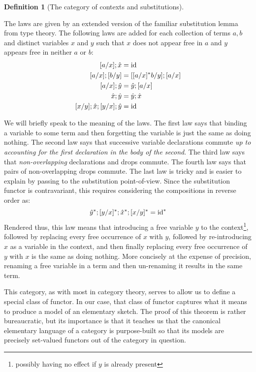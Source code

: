 \documentclass[12pt,twoside]{reedthesis}
\theoremstyle{definition}
\newtheorem{definition}{Definition}
\theoremstyle{remark}
\theoremstyle{plain}
\begin{document}
\begin{definition}[The category of contexts and substitutions]
\begin{outline}
    \1 The laws are given by an extended version of the familiar substitution
    lemma from type theory. The following laws are added for each collection of
    terms $a,b$ and distinct variables $x$ and $y$ such that $x$ does not appear
    free in $a$ and $y$ appears free in neither $a$ or $b$:
    \begin{align*}
      [a/x] ; \hat{x} &= \textrm{id} \\
      [a/x] ; [b/y]   &= [ [ a/x ]^{*} b/y ] ; [a/x] \\
      [a/x]; \hat{y} &= \hat{y}; [a/x] \\
      \hat{x}; \hat{y} &= \hat{y}; \hat{x} \\
      [x/y]; \hat{x}; [y/x]; \hat{y} &= \textrm{id}
    \end{align*}
  \end{outline}
  We will briefly speak to the meaning of the laws. The first law says that
  binding a variable to some term and then forgetting the variable is just the
  same as doing nothing. The second law says that successive variable
  declarations commute \emph{up to accounting for the first declaration in the
    body of the second}. The third law says that \emph{non-overlapping}
  declarations and drops commute. The fourth law says that pairs of
  non-overlapping drops commute. The last law is tricky and is easier to explain
  by passing to the substitution point-of-view. Since the substitution functor
  is contravariant, this requires considering the compositions in reverse order
  as:
  \[ \hat{y}^{*}; [y/x]^{*}; \hat{x}^{*}; [x/y]^{*} = {\textrm{id}}^{*} \] Rendered
  thus, this law means that introducing a free variable $y$ to the
  context\footnote{possibly having no effect if $y$ is already present},
  followed by replacing every free occurrence of $x$ with $y$, followed by
  re-introducing $x$ as a variable in the context, and then finally replacing
  every free occurrence of $y$ with $x$ is the same as doing nothing. More
  concisely at the expense of precision, renaming a free variable in a term and
  then un-renaming it results in the same term.
\end{definition}

This category, as with most in category theory, serves to allow us to define a
special class of functor. In our case, that class of functor captures what it
means to produce a model of an elementary sketch. The proof of this theorem is
rather bureaucratic, but its importance is that it teaches us that the canonical
elementary language of a category is purpose-built so that its models are
precisely set-valued functors out of the category in question.
\end{document}
